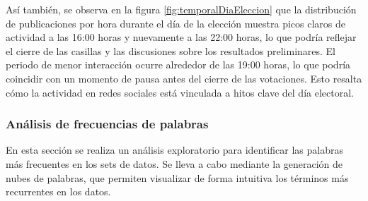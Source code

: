 \documentclass[10pt, a4paper]{article}
\begin{document}
	Así también, se observa en la figura \ref{fig:temporalDiaEleccion} que la distribución de publicaciones por hora durante el día de la elección muestra picos claros de actividad a las 16:00 horas y nuevamente a las 22:00 horas, lo que podría reflejar el cierre de las casillas y las discusiones sobre los resultados preliminares. El periodo de menor interacción ocurre alrededor de las 19:00 horas, lo que podría coincidir con un momento de pausa antes del cierre de las votaciones. Esto resalta cómo la actividad en redes sociales está vinculada a hitos clave del día electoral.
	
	
	\subsubsection{Análisis de frecuencias de palabras}
	
	En esta sección se realiza un análisis exploratorio para identificar las palabras más frecuentes en los sets de datos. Se lleva a cabo mediante la generación de nubes de palabras, que permiten visualizar de forma intuitiva los términos más recurrentes en los datos.
	
\end{document}
